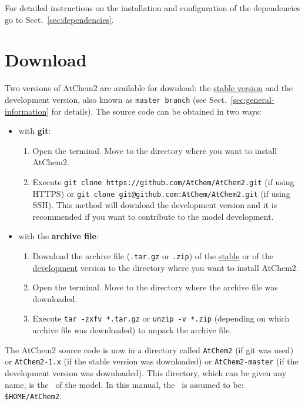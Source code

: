 For detailed instructions on the installation and configuration of the
dependencies go to Sect.~\ref{sec:dependencies}.

\section{Download} \label{sec:download}

Two versions of AtChem2 are available for download: the
\href{https://github.com/AtChem/AtChem2/releases/}{stable version} and
the development version, also known as \texttt{master\ branch} (see
Sect.~\ref{sec:general-information} for details). The source code can
be obtained in two ways:

\begin{itemize}
\item with \textbf{git}:
  \begin{enumerate}
  \item Open the terminal. Move to the directory where you want to
    install AtChem2.
  \item Execute \verb|git clone https://github.com/AtChem/AtChem2.git|
    (if using HTTPS) or \verb|git clone git@github.com:AtChem/AtChem2.git|
    (if using SSH). This method will download the development version
    and it is recommended if you want to contribute to the model
    development.
  \end{enumerate}
\item with the \textbf{archive file}:
  \begin{enumerate}
  \item Download the archive file (\texttt{.tar.gz} or \texttt{.zip}) of the
    \href{https://github.com/AtChem/AtChem2/releases/}{stable} or of the
    \href{https://github.com/AtChem/AtChem2/archive/master.zip}{development}
    version to the directory where you want to install AtChem2.
  \item Open the terminal. Move to the directory where the archive
    file was downloaded.
  \item Execute \verb|tar -zxfv *.tar.gz| or \verb|unzip -v *.zip|
    (depending on which archive file was downloaded) to unpack the
    archive file.
  \end{enumerate}
\end{itemize}

The AtChem2 source code is now in a directory called \texttt{AtChem2}
(if git was used) or \texttt{AtChem2-1.x} (if the stable version was
downloaded) or \texttt{AtChem2-master} (if the development version was
downloaded). This directory, which can be given any name, is the
\maindir\ of the model. In this manual, the \maindir\ is assumed to
be: \texttt{\$HOME/AtChem2}.

